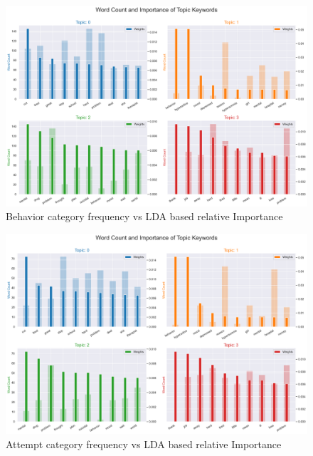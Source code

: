 \documentclass[sn-mathphys,Numbered]{sn-jnl}%
\theoremstyle{thmstyleone}%
\theoremstyle{thmstyletwo}%
\theoremstyle{thmstylethree}%
\begin{document}
\begin{figure}[H]
    \includegraphics[width=\textwidth]{behavior_weight_relative_imp.png}
    \caption{Behavior category frequency vs LDA based relative Importance}
    \label{behavior_weight_relative_imp}
\end{figure}
\hfill
\begin{figure}[H]
    \includegraphics[width=\textwidth]{attempt_weight_relative_imp.png}
    \caption{Attempt category frequency vs LDA based relative Importance}
    \label{attempt_weight_relative_imp}
\end{figure}   
 
\end{document}
